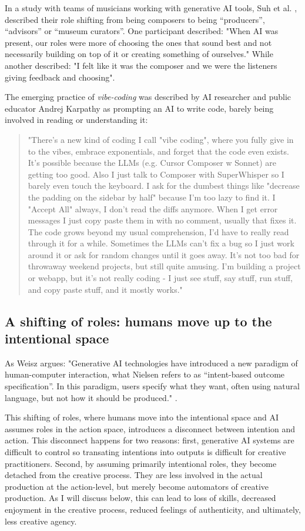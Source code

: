 In a study with teams of musicians working with generative AI tools, Suh et al. \cite{Suh2021-cj}, described their role shifting from being composers to being “producers”, “advisors” or “museum curators”. One participant described: "When AI was present, our roles were more of choosing the ones that sound best and not necessarily building on top of it or creating something of ourselves." While another described: "I felt like it was the composer and we were the listeners giving feedback and choosing". 

The emerging practice of \textit{vibe-coding} was described by AI researcher and public educator Andrej Karpathy as prompting an AI to write code, barely being involved in reading or understanding it:

\begin{quote}
"There's a new kind of coding I call "vibe coding", where you fully give in to the vibes, embrace exponentials, and forget that the code even exists. It's possible because the LLMs (e.g. Cursor Composer w Sonnet) are getting too good. Also I just talk to Composer with SuperWhisper so I barely even touch the keyboard. I ask for the dumbest things like "decrease the padding on the sidebar by half" because I'm too lazy to find it. I "Accept All" always, I don't read the diffs anymore. When I get error messages I just copy paste them in with no comment, usually that fixes it. The code grows beyond my usual comprehension, I'd have to really read through it for a while. Sometimes the LLMs can't fix a bug so I just work around it or ask for random changes until it goes away. It's not too bad for throwaway weekend projects, but still quite amusing. I'm building a project or webapp, but it's not really coding - I just see stuff, say stuff, run stuff, and copy paste stuff, and it mostly works."
\end{quote}

\subsection{A shifting of roles: humans move up to the intentional space}
As Weisz argues: "Generative AI technologies have introduced a new paradigm of human-computer interaction, what Nielsen refers to as “intent-based outcome specification”. In this paradigm, users specify what they want, often using natural language, but not how it should be produced." \cite{Weisz2024-io}.

This shifting of roles, where humans move into the intentional space and AI assumes roles in the action space, introduces a disconnect between intention and action. This disconnect happens for two reasons: first, generative AI systems are difficult to control so transating intentions into outputs is difficult for creative practitioners. Second, by assuming primarily intentional roles, they become detached from the creative process. They are less involved in the actual production at the action-level, but merely become automators of creative production. As I will discuss below, this can lead to loss of skills, decreased enjoyment in the creative process, reduced feelings of authenticity, and ultimately, less creative agency.


